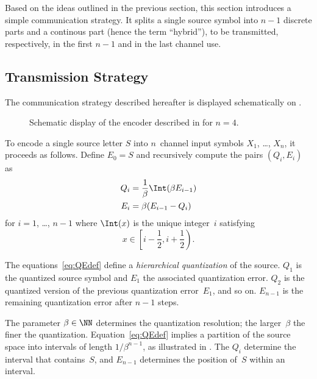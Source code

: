 Based on the ideas outlined in the previous section, this section
introduces a simple communication strategy. It splits a single source symbol
into $n-1$ discrete parts and a continous part (hence the term ``hybrid''), to
be transmitted, respectively, in the first $n-1$ and in the last channel use. 


\subsection{Transmission Strategy}\label{sec:commscheme}

The communication strategy described hereafter is displayed schematically on
.
\begin{figure}
  \begin{center}
    
  \end{center}
  \caption{Schematic display of the encoder described in  for
  $n = 4$.}
  \label{fig:1nencoding}
\end{figure}
To encode a single source letter $S$ into $n$~channel input symbols $X_1$,
\dots, $X_n$, it proceeds as follows. Define $E_0 = S$ and recursively compute
the pairs $(Q_i, E_i)$ as
\begin{subequations}\label{eq:QEdef}
\begin{align}
  Q_i &= \frac{1}{\beta}\Int(\beta E_{i-1}) \label{eq:QEdefA} \\
  E_i &= \beta (E_{i-1} - Q_i) \label{eq:QEdefB}
\end{align}
\end{subequations}
for $i = 1$, \dots, $n-1$ where $\Int(x)$ is the unique integer~$i$ satisfying
\begin{equation*}
  x \in \left[i - \frac12, i +\frac12\right).
\end{equation*}

The equations~\ref{eq:QEdef} define a \emph{hierarchical quantization} of the
source. $Q_1$ is the quantized source symbol and $E_1$ the associated
quantization error. $Q_2$ is the quantized version of the previous quantization
error~$E_1$, and so on. $E_{n-1}$ is the remaining quantization error after
$n-1$ steps.

The parameter $\beta \in \NN$ determines the quantization
resolution; the larger~$\beta$ the finer the quantization.
Equation~\ref{eq:QEdef} implies a partition of the source space into intervals
of length $1/\beta^{n-1}$, as illustrated in . The
$Q_i$ determine the interval that contains~$S$, and $E_{n-1}$ determines the
position of~$S$ within an interval. 

